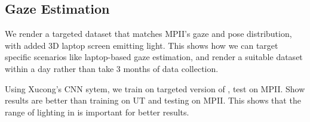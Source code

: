 

\subsection{Gaze Estimation}



We render a targeted dataset that matches MPII's gaze and pose distribution, with added 3D laptop screen emitting light. This shows how we can target specific scenarios like laptop-based gaze estimation, and render a suitable dataset within a day rather than take 3 months of data collection.

Using Xucong's CNN sytem, we train on targeted version of \dataset, test on MPII. Show results are better than training on UT and testing on MPII. This shows that the range of lighting in \dataset is important for better results.


